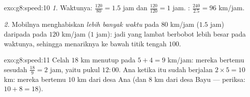 \begin{solution}{exo:g8:speed:10}
\emph{1.} Waktunya: $\frac{120}{80} = 1.5$ jam dan
$\frac{120}{120} = 1$ jam. :
$\frac{240}{2.5} = 96$ km/jam.

\emph{2.} Mobilnya menghabiskan \emph{lebih banyak waktu} pada
$80$ km/jam ($1.5$ jam) daripada pada $120$ km/jam ($1$ jam): jadi
 yang lambat berbobot lebih besar pada 
waktunya, sehingga menariknya ke bawah titik tengah $100$.
\end{solution}

\begin{solution}{exo:g8:speed:11}
Celah $18$ km menutup pada $5 + 4 = 9$ km/jam: mereka bertemu sesudah
$\frac{18}{9} = 2$ jam, yaitu pukul $12{:}00$. Ana ketika itu sudah
berjalan $2 \times 5 = 10$ km: mereka bertemu $10$ km dari desa Ana
(dan $8$ km dari desa Bayu --- periksa: $10 + 8 = 18$).
\end{solution}

